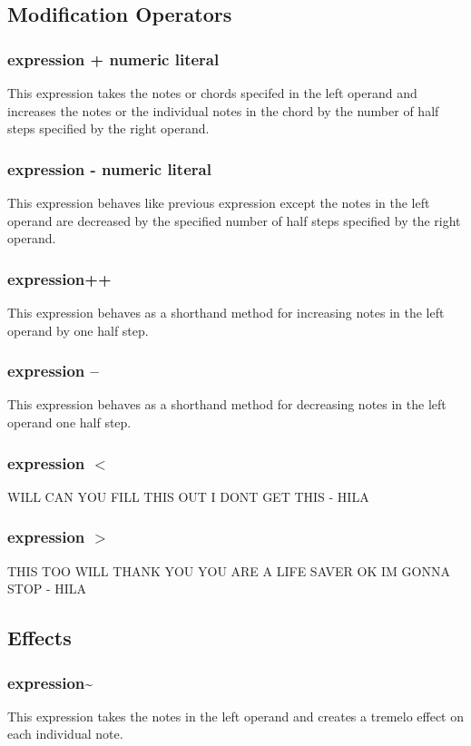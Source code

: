 \documentclass[letterpaper]{article}
\begin{document}
\subsection{Modification Operators}
\subsubsection{expression + numeric literal}
This expression takes the notes or chords specifed in the left operand and increases the notes or the individual notes in the chord by the number of half steps specified by the right operand. 

\subsubsection{expression - numeric literal}
This expression behaves like previous expression except the notes in the left operand are decreased by the specified number of half steps specified by the right operand. 

\subsubsection{expression++}
This expression behaves as a shorthand method for increasing notes in the left operand by one half step. 

\subsubsection{expression --}
This expression behaves as a shorthand method for decreasing notes in the left operand one half step. 

\subsubsection{expression $<$}
WILL CAN YOU FILL THIS OUT I DONT GET THIS - HILA

\subsubsection{expression $>$}
THIS TOO WILL THANK YOU YOU ARE A LIFE SAVER OK IM GONNA STOP - HILA

\subsection{Effects}

\subsubsection{expression\~{}}
This expression takes the notes in the left operand and creates a tremelo effect on each individual note. 
\end{document}
